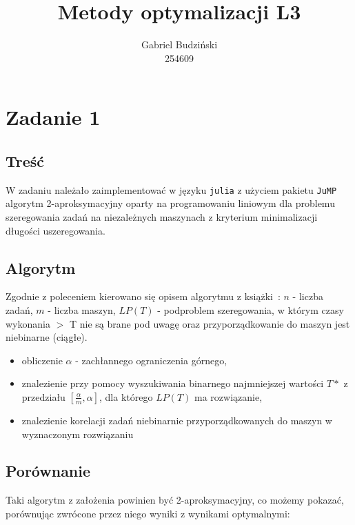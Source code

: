 \documentclass{article}
\title{Metody optymalizacji L3}
\author{Gabriel Budziński\\254609}
\begin{document}
\maketitle

\section{Zadanie 1}

\subsection*{Treść}

W zadaniu należało zaimplementować w języku \texttt{julia} z użyciem pakietu \texttt{JuMP} algorytm 2-aproksymacyjny oparty na programowaniu liniowym dla problemu szeregowania zadań na niezależnych maszynach z kryterium minimalizacji długości uszeregowania.

\subsection*{Algorytm}

Zgodnie z poleceniem kierowano się opisem algorytmu z książki~\cite{vazirani}:
$n$ - liczba zadań, $m$ - liczba maszyn, $LP(T)$ - podproblem szeregowania, w którym czasy wykonania $>$ T nie są brane pod uwagę oraz przyporządkowanie do maszyn jest niebinarne (ciągłe).

\begin{itemize}
    \item obliczenie $\alpha$ - zachłannego ograniczenia górnego,
    \item znalezienie przy pomocy wyszukiwania binarnego najmniejszej wartości $T*$ z przedziału $[\frac{\alpha}{m}, \alpha]$, dla którego $LP(T)$ ma rozwiązanie,
    \item znalezienie korelacji zadań niebinarnie przyporządkowanych do maszyn w wyznaczonym rozwiązaniu
\end{itemize}

\subsection*{Porównanie}

Taki algorytm z założenia powinien być 2-aproksymacyjny, co możemy pokazać, porównując zwrócone przez niego wyniki z wynikami optymalnymi:
\end{document}
